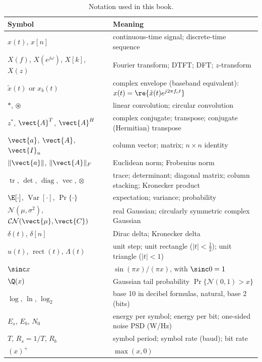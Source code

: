 \begin{table}[htbp]\centering\small
\caption{Notation used in this book.}\label{tab:appA:notation}
\begin{tabular}{@{}ll@{}}
\toprule
Symbol & Meaning\\
\midrule
$x(t)$, $x[n]$ & continuous-time signal; discrete-time sequence\\
$X(f)$, $X(e^{j\omega})$, $X[k]$, $X(z)$ & Fourier transform; DTFT; DFT; $z$-transform\\
$\tilde x(t)$ or $x_b(t)$ & complex envelope (baseband equivalent): $x(t)=\re\{\tilde x(t)e^{j2\pi f_c t}\}$\\
$*$, $\circledast$ & linear convolution; circular convolution\\
$z^*$, $\vect{A}^T$, $\vect{A}^H$ & complex conjugate; transpose; conjugate (Hermitian) transpose\\
$\vect{a}$, $\vect{A}$, $\vect{I}_n$ & column vector; matrix; $n\times n$ identity\\
$\|\vect{a}\|$, $\|\vect{A}\|_F$ & Euclidean norm; Frobenius norm\\
$\operatorname{tr}$, $\det$, $\operatorname{diag}$, $\operatorname{vec}$, $\otimes$ & trace; determinant; diagonal matrix; column stacking; Kronecker product\\
$\E[\cdot]$, $\operatorname{Var}[\cdot]$, $\Pr\{\cdot\}$ & expectation; variance; probability\\
$\mathcal{N}(\mu,\sigma^2)$, $\mathcal{CN}(\vect{\mu},\vect{C})$ & real Gaussian; circularly symmetric complex Gaussian\\
$\delta(t)$, $\delta[n]$ & Dirac delta; Kronecker delta\\
$u(t)$, $\operatorname{rect}(t)$, $\Lambda(t)$ & unit step; unit rectangle ($|t|<\tfrac12$); unit triangle ($|t|<1$)\\
$\sinc x$ & $\sin(\pi x)/(\pi x)$, with $\sinc 0=1$\\
$\Q(x)$ & Gaussian tail probability $\Pr\{\mathcal N(0,1)>x\}$\\
$\log$, $\ln$, $\log_2$ & base 10 in decibel formulas, natural, base 2 (bits)\\
$E_s$, $E_b$, $N_0$ & energy per symbol; energy per bit; one-sided noise PSD (W/Hz)\\
$T$, $R_s=1/T$, $R_b$ & symbol period; symbol rate (baud); bit rate\\
$(x)^+$ & $\max(x,0)$\\
\bottomrule
\end{tabular}
\end{table}

